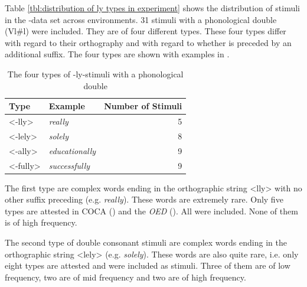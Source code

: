 Table \ref{tbl:distribution of ly types in experiment} shows the distribution of  stimuli in the -data set across environments. 
31 stimuli with a phonological double (Vl\#l) were included. 
They are of four different types. These four types differ with regard to their orthography and with regard to whether  is preceded by an additional suffix. The four types are shown with examples in .




\begin{table}[b!]
	\caption{The four types of -ly-stimuli with a phonological double}
	\label{tbl:The four types of ly-stimuli with a phonological double}
	
	\begin{center}
		\begin{tabular} {llr}
			
			Type & Example & Number of  Stimuli\\
			
			\hline
			<-lly>&\color[HTML]{3166FF}\textit{really} & 5 \\ 
			<-lely>  \phantom{hggzujg}&\color[HTML]{3166FF}\textit{solely} & 8\\ 
			<-ally>&\color[HTML]{3166FF}\textit{educationally} &9\\ 
			<-fully>&\color[HTML]{3166FF}\textit{successfully} & 9 \\ 
			\hline   	
			
			
		\end{tabular}
	\end{center}
\end{table}


The first type are complex words ending in the orthographic string <lly> with no other suffix preceding  (e.g. \textit{really}). These words are extremely rare. Only five types are attested  in COCA (\citealt{Davies.20082014}) and the \textit{OED} (\citealt{OED.2013}). All were included. None of them is of high frequency.

The second type of double consonant stimuli are complex words ending in the orthographic string <lely> (e.g. \textit{solely}). These words are also quite rare, i.e. only eight  types are attested and were included as stimuli. Three of them  are of low frequency, two are of mid frequency and two are of high frequency.



